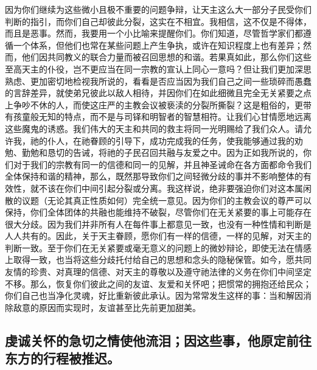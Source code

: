 因为你们继续为这些微小且极不重要的问题争辩，让天主这么大一部分子民受你们判断的指引，而你们自己却彼此分裂，这实在不相宜。我相信，这不仅是不得体，而且是恶事。然而，我要用一个小比喻来提醒你们。你们知道，尽管哲学家们都遵循一个体系，但他们也常在某些问题上产生争执，或许在知识程度上也有差异；然而，他们因共同教义的联合力量而被召回思想的和谐。若果真如此，那么你们这些至高天主的仆役，岂不更应当在同一宗教的宣认上同心一意吗？但让我们更加深思熟虑、更加密切地检视我所说的，看看是否应当因为我们自己之间一些琐碎而愚蠢的言辞差异，就使弟兄彼此以敌人相待，并因你们在如此细微且完全无关紧要之点上争吵不休的人，而使这庄严的主教会议被亵渎的分裂所撕裂？这是粗俗的，更带有孩童般无知的特点，而不是与司铎和明智者的智慧相符。让我们心甘情愿地远离这些魔鬼的诱惑。我们伟大的天主和共同的救主将同一光明赐给了我们众人。请允许我，祂的仆人，在祂眷顾的引导下，成功完成我的任务，使我能够通过我的劝勉、勤勉和恳切的告诫，将祂的子民召回共融与友爱之中。因为正如我所说的，你们对于我们的宗教有同一的信德和同一的见解，并且神圣诫命在各方面都命令我们全体保持和谐的精神，那么，既然那导致你们之间轻微分歧的事并不影响整体的有效性，就不该在你们中间引起分裂或分离。我这样说，绝非要强迫你们对这本属闲散的议题（无论其真正性质如何）完全统一意见。因为你们的主教会议的尊严可以保持，你们全体团体的共融也能维持不破裂，尽管你们在无关紧要的事上可能存在很大分歧。因为我们并非所有人在每件事上都意见一致，也没有一种性情和判断是人人共有的。因此，关于天主眷顾，愿你们有一样的信德，一样的见解，对天主的判断一致。至于你们在无关紧要或毫无意义的问题上的微妙辩论，即使无法在情感上取得一致，也当将这些分歧托付给自己的思想和念头的隐秘保管。如今，愿共同友情的珍贵、对真理的信德、对天主的尊敬以及遵守祂法律的义务在你们中间坚定不移。那么，恢复你们彼此之间的友谊、友爱和关怀吧；把惯常的拥抱还给民众；你们自己也当净化灵魂，好比重新彼此承认。因为常常发生这样的事：当和解因消除敌意的原因而实现时，友谊甚至比先前更加甜美。\par


\subsection{虔诚关怀的急切之情使他流泪；因这些事，他原定前往东方的行程被推迟。}

\par

